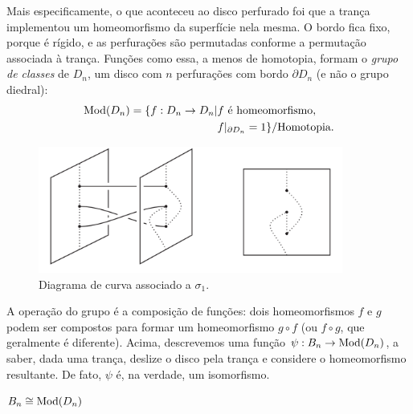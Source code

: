 	\par\vspace{0.3cm} Mais especificamente, o que aconteceu ao disco perfurado foi que a trança 
	implementou um homeomorfismo da superfície nela mesma. O bordo fica fixo, porque é rígido, e 
	as perfurações são permutadas conforme a permutação associada à trança. Funções como essa, a 
	menos de homotopia, formam o \textit{grupo de classes} de $D_n$, um disco com $n$ perfurações 
	com bordo $\partial D_n$ (e não o grupo diedral):
	\begin{align*}
    	\operatorname{Mod}(D_n) = \{ f:D_n\to D_n|& f\text{ é homeomorfismo}, \\
    	&f|_{\partial D_n} = 1 \}/\text{Homotopia}.
	\end{align*}
	\begin{figure}[H]
	\begin{center}
		\includegraphics[width=10cm]{Images/tranca_disco_perfurado.png}
	\end{center}\caption{Diagrama de curva associado a $\sigma_1$.}
	\label{tranca disco perfurado}
	\end{figure}
	A operação do grupo é a composição de funções: dois homeomorfismos $f$ e $g$ podem ser 
	compostos para formar um homeomorfismo $g\circ f$ (ou $f\circ g$, que geralmente é diferente). 
	Acima, descrevemos uma função $\psi: B_n\to\operatorname{Mod}(D_n)$, a saber, dada uma trança, deslize o 
	disco pela trança e considere o homeomorfismo resultante. De fato, $\psi$ é, na verdade, um isomorfismo.
	\begin{theorem}
	\label{B_n isomorfo a Mod(D_n)}
		$B_n\cong \operatorname{Mod}(D_n)$ 
	\end{theorem}

